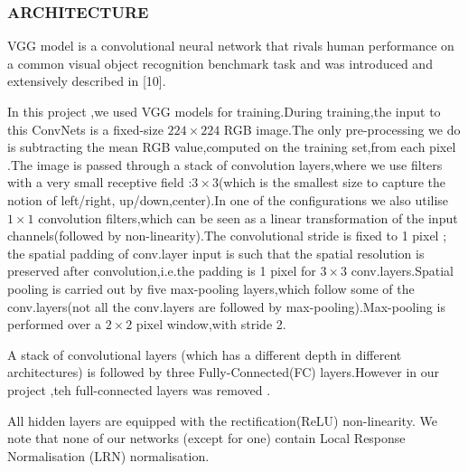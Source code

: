\documentclass[conference]{IEEEtran}
\begin{document}
\subsubsection{ARCHITECTURE}

VGG model is a convolutional neural network that rivals human performance 
on a common visual object recognition benchmark task and was introduced and 
extensively described in [10]. 

In this project ,we used VGG models for training.During training,the input
to this ConvNets is a fixed-size $224\times224$ RGB image.The only pre-processing we do is subtracting the mean RGB value,computed on the training set,from each pixel .The image is passed through a stack of 
convolution layers,where we use filters with a very small receptive field
:$3\times 3$(which is the smallest size to capture the notion of left/right,
up/down,center).In one of the configurations we also utilise $1\times1$ convolution filters,which can be seen as a linear transformation of the
input channels(followed by non-linearity).The convolutional stride is fixed 
to 1 pixel ; the spatial padding of conv.layer input is such that the spatial
resolution is preserved after convolution,i.e.the padding is 1 pixel for $3\times 3$ conv.layers.Spatial pooling is carried out by five max-pooling
layers,which follow some of the conv.layers(not all the conv.layers are followed by max-pooling).Max-pooling is performed over a $2\times 2$ pixel 
window,with stride 2.

A stack of convolutional layers (which has a different depth in different 
architectures) is followed by three Fully-Connected(FC) layers.However in our 
project ,teh full-connected layers was removed .

All hidden layers are equipped with the rectification(ReLU) non-linearity.
We note that none of our networks (except for one) contain Local Response
Normalisation (LRN) normalisation.
\end{document}
